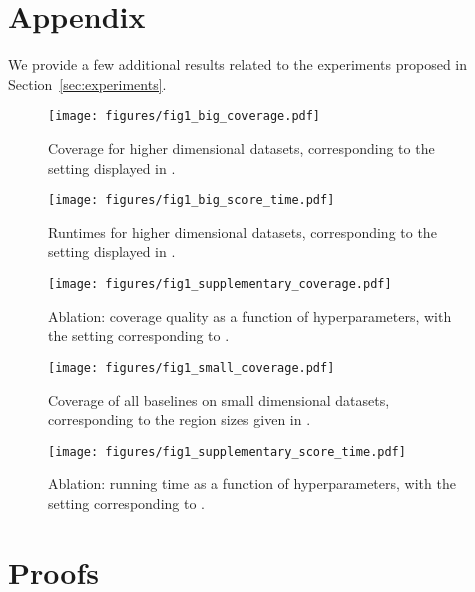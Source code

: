 










\section{Appendix}
We provide a few additional results related to the experiments proposed in Section~\ref{sec:experiments}.
\begin{figure}
    \centering
    \texttt{[image: figures/fig1\_big\_coverage.pdf]}
    \caption{Coverage for higher dimensional datasets, corresponding to the setting displayed in .}
    \label{fig:big-coverage}
\end{figure}

\begin{figure}
    \centering
    \texttt{[image: figures/fig1\_big\_score\_time.pdf]}
    \caption{Runtimes for higher dimensional datasets, corresponding to the setting displayed in .}
    \label{fig:big-time}
\end{figure}

\begin{figure}
    \centering
    \texttt{[image: figures/fig1\_supplementary\_coverage.pdf]}
    \caption{Ablation: coverage quality as a function of hyperparameters, with the setting corresponding to .}
    \label{fig:sup-coverage}
\end{figure}
\begin{figure}
    \centering
    \texttt{[image: figures/fig1\_small\_coverage.pdf]}
    \caption{Coverage of all baselines on small dimensional datasets, corresponding to the region sizes given in .}
    \label{fig:small-coverage}
\end{figure}


\begin{figure*}
    \centering
    \texttt{[image: figures/fig1\_supplementary\_score\_time.pdf]}
    \caption{Ablation: running time as a function of hyperparameters, with the setting corresponding to .}
    \label{fig:enter-label}
\end{figure*}


\newpage
\section{Proofs}

